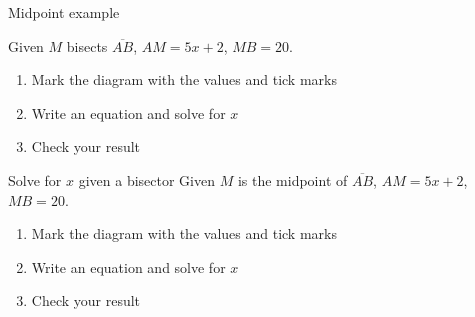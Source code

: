 \documentclass[onlytextwidth]{beamer}
\begin{document}
\begin{frame}{Midpoint example}
  \begin{block}{Given $M$ bisects $\overline{AB}$, $AM=5x+2$, $MB=20$.}
    \begin{enumerate}
      \item Mark the diagram with the values and tick marks
      \item Write an equation and solve for $x$
      \item Check your result
    \end{enumerate} \vspace{1cm}
      \begin{center}
      \end{center}
  \end{block}
\end{frame}

\begin{frame}{Solve for $x$ given a bisector}
  Given $M$ is the midpoint of $\overline{AB}$, $AM=5x+2$, $MB=20$.
  \begin{enumerate}
    \item Mark the diagram with the values and tick marks
    \item Write an equation and solve for $x$
    \item Check your result
  \end{enumerate} \vspace{1cm}
    \begin{center}
    \end{center} \vspace{4cm}
  \end{frame}
  
\end{document}
